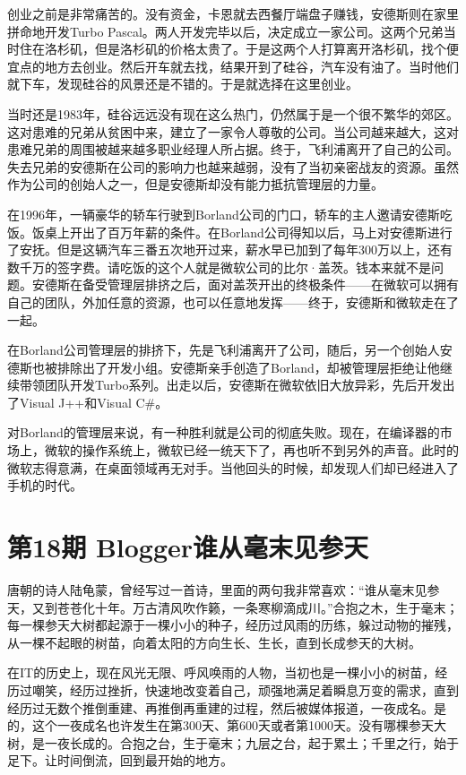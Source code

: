\documentclass[
  letterpaper,
  DIV=11,
  numbers=noendperiod]{scrreprt}
\begin{document}
创业之前是非常痛苦的。没有资金，卡恩就去西餐厅端盘子赚钱，安德斯则在家里拼命地开发Turbo
Pascal。两人开发完毕以后，决定成立一家公司。这两个兄弟当时住在洛杉矶，但是洛杉矶的价格太贵了。于是这两个人打算离开洛杉矶，找个便宜点的地方去创业。然后开车就去找，结果开到了硅谷，汽车没有油了。当时他们就下车，发现硅谷的风景还是不错的。于是就选择在这里创业。

当时还是1983年，硅谷远远没有现在这么热门，仍然属于是一个很不繁华的郊区。这对患难的兄弟从贫困中来，建立了一家令人尊敬的公司。当公司越来越大，这对患难兄弟的周围被越来越多职业经理人所占据。终于，飞利浦离开了自己的公司。失去兄弟的安德斯在公司的影响力也越来越弱，没有了当初亲密战友的资源。虽然作为公司的创始人之一，但是安德斯却没有能力抵抗管理层的力量。

在1996年，一辆豪华的轿车行驶到Borland公司的门口，轿车的主人邀请安德斯吃饭。饭桌上开出了百万年薪的条件。在Borland公司得知以后，马上对安德斯进行了安抚。但是这辆汽车三番五次地开过来，薪水早已加到了每年300万以上，还有数千万的签字费。请吃饭的这个人就是微软公司的比尔·盖茨。钱本来就不是问题。安德斯在备受管理层排挤之后，面对盖茨开出的终极条件------在微软可以拥有自己的团队，外加任意的资源，也可以任意地发挥------终于，安德斯和微软走在了一起。

在Borland公司管理层的排挤下，先是飞利浦离开了公司，随后，另一个创始人安德斯也被排除出了开发小组。安德斯亲手创造了Borland，却被管理层拒绝让他继续带领团队开发Turbo系列。出走以后，安德斯在微软依旧大放异彩，先后开发出了Visual
J++和Visual C\#。

对Borland的管理层来说，有一种胜利就是公司的彻底失败。现在，在编译器的市场上，微软的操作系统上，微软已经一统天下了，再也听不到另外的声音。此时的微软志得意满，在桌面领域再无对手。当他回头的时候，却发现人们却已经进入了手机的时代。


\chapter{第18期
Blogger谁从毫末见参天}\label{ux7b2c18ux671f-bloggerux8c01ux4eceux6bebux672bux89c1ux53c2ux5929}

唐朝的诗人陆龟蒙，曾经写过一首诗，里面的两句我非常喜欢：``谁从毫末见参天，又到苍苍化十年。万古清风吹作籁，一条寒柳滴成川。''合抱之木，生于毫末；每一棵参天大树都起源于一棵小小的种子，经历过风雨的历练，躲过动物的摧残，从一棵不起眼的树苗，向着太阳的方向生长、生长，直到长成参天的大树。

在IT的历史上，现在风光无限、呼风唤雨的人物，当初也是一棵小小的树苗，经历过嘲笑，经历过挫折，快速地改变着自己，顽强地满足着瞬息万变的需求，直到经历过无数个推倒重建、再推倒再重建的过程，然后被媒体报道，一夜成名。是的，这个一夜成名也许发生在第300天、第600天或者第1000天。没有哪棵参天大树，是一夜长成的。合抱之台，生于毫末；九层之台，起于累土；千里之行，始于足下。让时间倒流，回到最开始的地方。
\end{document}
